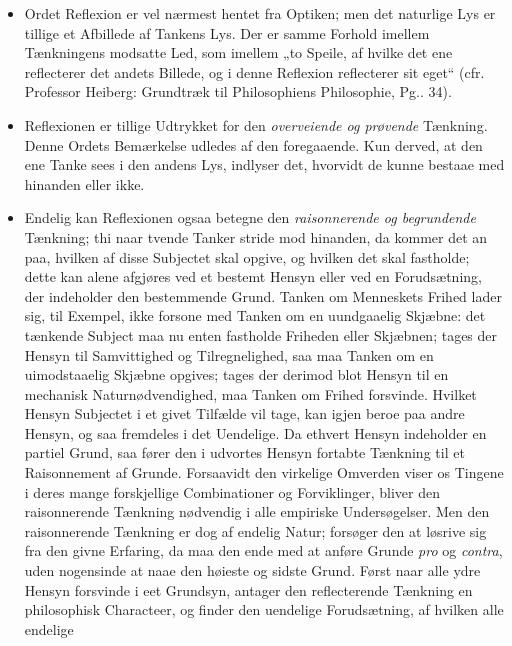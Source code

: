 \documentclass[12pt]{book}
\newcommand{\opage}[1]{\marginnote{\footnotesize\textit{[#1]}}}
\begin{document}
\begin{itemize}
\item[a)] Ordet Reflexion er vel nærmest hentet fra Optiken; men det
  naturlige Lys er tillige et Afbillede af Tankens Lys. Der er samme Forhold
  imellem Tænkningens modsatte Led, som imellem „to Speile, af hvilke det ene
  reflecterer det andets Billede, og i denne Reflexion reflecterer sit eget“
  (cfr. Professor Heiberg: Grundtræk til Philosophiens Philosophie, Pg.. 34).
\item[b)] Reflexionen er tillige Udtrykket for den \emph{overveiende og
  prøvende} Tænkning. Denne Ordets Bemærkelse udledes af den foregaaende. Kun
  derved, at den ene Tanke sees i den andens Lys, indlyser det, hvorvidt de
  kunne bestaae med hinanden eller ikke.
\item[c)] Endelig kan Reflexionen ogsaa betegne den \emph{raisonnerende og
  begrundende} Tænkning; thi naar tvende Tanker stride mod hinanden, da kommer
  det an paa, hvilken af disse Subjectet skal opgive, og hvilken det skal
  fastholde; dette kan alene afgjøres ved et bestemt Hensyn eller ved en
  Forudsætning, der indeholder den bestemmende Grund. Tanken om Menneskets
  Frihed lader sig, til Exempel, ikke forsone med Tanken om en uundgaaelig
  Skjæbne: det tænkende Subject maa nu enten fastholde Friheden eller
  Skjæbnen; tages der Hensyn til Samvittighed og Tilregnelighed, saa maa
  Tanken om en uimodstaaelig Skjæbne opgives; tages der derimod blot Hensyn
  til en mechanisk Naturnødvendighed, maa Tanken om Frihed forsvinde. Hvilket
  Hensyn Subjectet i et givet Tilfælde vil tage, kan igjen beroe paa andre
  Hensyn, og saa fremdeles i det
  \opage{16} Uendelige. Da ethvert Hensyn indeholder en partiel Grund, saa fører den i
  udvortes Hensyn fortabte Tænkning til et Raisonnement af Grunde. Forsaavidt
  den virkelige Omverden viser os Tingene i deres mange forskjellige
  Combinationer og Forviklinger, bliver den raisonnerende Tænkning nødvendig i
  alle empiriske Undersøgelser. Men den raisonnerende Tænkning er dog af
  endelig Natur; forsøger den at løsrive sig fra den givne Erfaring, da maa
  den ende med at anføre Grunde \textit{pro} og \textit{contra}, uden
  nogensinde at naae den høieste og sidste Grund. Først naar alle ydre Hensyn
  forsvinde i eet Grundsyn, antager den reflecterende Tænkning en philosophisk
  Characteer, og finder den uendelige Forudsætning, af hvilken alle endelige

\end{itemize}
\end{document}
